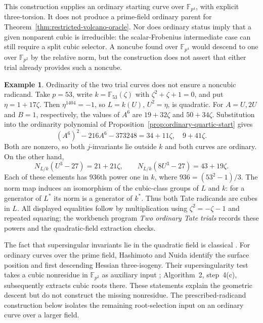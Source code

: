\documentclass[11pt]{article}
\theoremstyle{definition}
\newtheorem{example}[theorem]{Example}
\theoremstyle{remark}
\begin{document}
This construction supplies an ordinary starting curve over
$\mathbb F_{p^4}$, with explicit three-torsion.  It does not
produce a prime-field ordinary parent for
Theorem~\ref{thm:restricted-volcano-oracle}.  Nor does ordinary
status imply that a given nonparent cubic is irreducible:
the scalar-Frobenius intermediate case can still require a
split cubic selector.  A noncube found over $\mathbb F_{p^4}$
would descend to one over $\mathbb F_{p^2}$ by the relative
norm, but the construction does not assert that either trial
already provides such a noncube.


\begin{example}\label{ex:ordinary-both-cubic}
Ordinarity of the two trial curves does not ensure a noncubic
radicand.  Take $p=53$, write $k=\mathbb F_{53}(\zeta)$ with
$\zeta^2+\zeta+1=0$, and put $\eta=1+17\zeta$.
Then $\eta^{1404}=-1$, so $L=k(U)$, $U^2=\eta$, is quadratic.
For $A=U,2U$ and $B=1$, respectively, the values of $A^6$ are
$19+32\zeta$ and $50+34\zeta$.  Substitution into the ordinarity
polynomial of Proposition~\ref{prop:ordinary-quartic-start} gives
\[
 (A^6)^2-216A^6-373248
 =34+11\zeta,\quad 9+41\zeta.
\]
Both are nonzero, so both $j$-invariants lie outside $k$ and both
curves are ordinary.  On the other hand,
\[
 N_{L/k}(U^3-27)=21+21\zeta,\qquad
 N_{L/k}(8U^3-27)=43+19\zeta.
\]
Each of these elements has $936$th power one in $k$, where
$936=(53^2-1)/3$.  The norm map induces an isomorphism of the
cubic-class groups of $L$ and $k$: for a generator of $L^*$ its
norm is a generator of $k^*$.  Thus both Tate radicands are cubes
in $L$.  All displayed equalities follow by multiplication using
$\zeta^2=-\zeta-1$ and repeated squaring; the workbench program
\emph{Two ordinary Tate trials} records these powers and the
quadratic-field extraction checks.
\end{example}

The fact that supersingular invariants lie in the quadratic field
is classical \citep[Theorem~V.3.1(a)(iii), pp.~145--146]{Silverman2009}.
For ordinary curves over the prime field, Hashimoto and Nuida
\citep[Theorem~3.10 and Corollary~3.11, p.~12]{HashimotoNuida2026}
identify the surface position and first descending Hessian
three-isogeny.  Their supersingularity test takes a cubic
nonresidue in $\mathbb F_{p^2}$ as auxiliary input
\citep[Section~4, pp.~13--14]{HashimotoNuida2026}; Algorithm~2,
step~4(c), subsequently extracts cubic roots there.  These
statements explain the geometric descent but do not construct
the missing nonresidue.  The prescribed-radicand construction
below isolates the remaining root-selection input on an
ordinary curve over a larger field.
\end{document}
